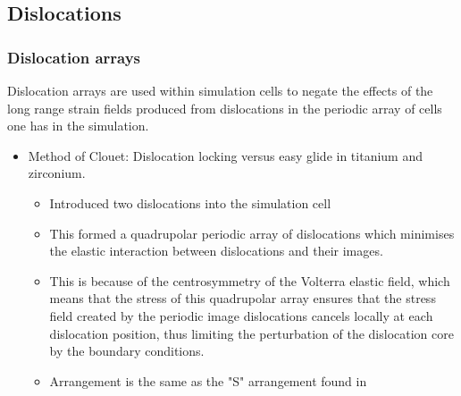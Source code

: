 \documentclass[11pt]{article}
\begin{document}
\subsection{Dislocations}
\label{sec:org60a8a27}
\subsubsection{Dislocation arrays}
\label{sec:org032e6f5}
Dislocation arrays are used within simulation cells to negate the effects of
the long range strain fields produced from dislocations in the periodic array
of cells one has in the simulation.
\begin{itemize}
\item Method of Clouet: Dislocation locking versus easy glide in titanium and
zirconium. \cite{Clouet2015} 
\begin{itemize}
\item Introduced two dislocations into the simulation cell
\item This formed a quadrupolar periodic array of dislocations which
minimises the elastic interaction between dislocations and their
images.
\item This is because of the centrosymmetry of the Volterra elastic field,
which means that the stress of this quadrupolar array ensures that the
stress field created by the periodic image dislocations cancels locally
at each dislocation position, thus limiting the perturbation of the
dislocation core by the boundary conditions.
\item Arrangement is the same as the "S" arrangement found in
\cite{Clouet2012}
\end{itemize}
\end{itemize}
\end{document}
